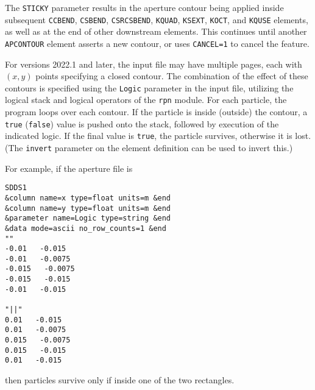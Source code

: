 The \verb|STICKY| parameter results in the aperture contour being applied inside subsequent \verb|CCBEND|,
\verb|CSBEND|, \verb|CSRCSBEND|, \verb|KQUAD|, \verb|KSEXT|, \verb|KOCT|, and \verb|KQUSE| elements, as well as at the
end of other downstream elements. This continues until another \verb|APCONTOUR| element asserts a new contour, or uses
\verb|CANCEL=1| to cancel the feature.

For versions 2022.1 and later, the input file may have multiple pages, each with $(x, y)$ points specifying a
closed contour. The combination of the effect of these contours is specified using the \verb|Logic| parameter in
the input file, utilizing the logical stack and logical operators of the \verb|rpn| module.
For each particle, the program loops over each contour.
If the particle is inside (outside) the contour, a \verb|true| (\verb|false|) value is pushed onto the stack,
followed by execution of the indicated logic.
If the final value is \verb|true|, the particle survives,  otherwise it is lost.
(The \verb|invert| parameter on the element definition can be used to invert this.)

For example, if the aperture file is
\begin{verbatim}
SDDS1
&column name=x type=float units=m &end
&column name=y type=float units=m &end
&parameter name=Logic type=string &end
&data mode=ascii no_row_counts=1 &end
""
-0.01   -0.015
-0.01   -0.0075
-0.015   -0.0075
-0.015   -0.015
-0.01   -0.015

"||"
0.01   -0.015
0.01   -0.0075
0.015   -0.0075
0.015   -0.015
0.01   -0.015
\end{verbatim}
then particles survive only if inside one of the two rectangles.
